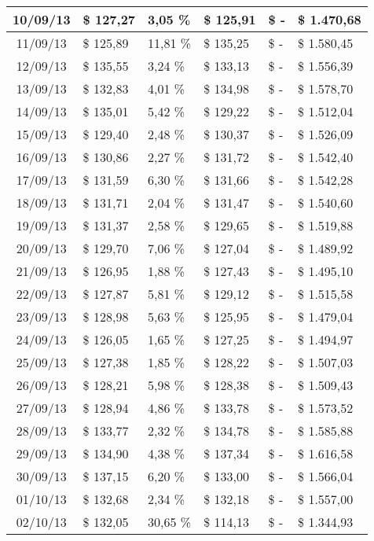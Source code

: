 \begin{small}
\begin{longtable}{|c|l|l|l|l|l|}
10/09/13 & \$ 127,27 & 3,05 \% & \$ 125,91 & \$ - & \$ 1.470,68 \\ \hline
11/09/13 & \$ 125,89 & 11,81 \% & \$ 135,25 & \$ - & \$ 1.580,45 \\ \hline
12/09/13 & \$ 135,55 & 3,24 \% & \$ 133,13 & \$ - & \$ 1.556,39 \\ \hline
13/09/13 & \$ 132,83 & 4,01 \% & \$ 134,98 & \$ - & \$ 1.578,70 \\ \hline
14/09/13 & \$ 135,01 & 5,42 \% & \$ 129,22 & \$ - & \$ 1.512,04 \\ \hline
15/09/13 & \$ 129,40 & 2,48 \% & \$ 130,37 & \$ - & \$ 1.526,09 \\ \hline
16/09/13 & \$ 130,86 & 2,27 \% & \$ 131,72 & \$ - & \$ 1.542,40 \\ \hline
17/09/13 & \$ 131,59 & 6,30 \% & \$ 131,66 & \$ - & \$ 1.542,28 \\ \hline
18/09/13 & \$ 131,71 & 2,04 \% & \$ 131,47 & \$ - & \$ 1.540,60 \\ \hline
19/09/13 & \$ 131,37 & 2,58 \% & \$ 129,65 & \$ - & \$ 1.519,88 \\ \hline
20/09/13 & \$ 129,70 & 7,06 \% & \$ 127,04 & \$ - & \$ 1.489,92 \\ \hline
21/09/13 & \$ 126,95 & 1,88 \% & \$ 127,43 & \$ - & \$ 1.495,10 \\ \hline
22/09/13 & \$ 127,87 & 5,81 \% & \$ 129,12 & \$ - & \$ 1.515,58 \\ \hline
23/09/13 & \$ 128,98 & 5,63 \% & \$ 125,95 & \$ - & \$ 1.479,04 \\ \hline
24/09/13 & \$ 126,05 & 1,65 \% & \$ 127,25 & \$ - & \$ 1.494,97 \\ \hline
25/09/13 & \$ 127,38 & 1,85 \% & \$ 128,22 & \$ - & \$ 1.507,03 \\ \hline
26/09/13 & \$ 128,21 & 5,98 \% & \$ 128,38 & \$ - & \$ 1.509,43 \\ \hline
27/09/13 & \$ 128,94 & 4,86 \% & \$ 133,78 & \$ - & \$ 1.573,52 \\ \hline
28/09/13 & \$ 133,77 & 2,32 \% & \$ 134,78 & \$ - & \$ 1.585,88 \\ \hline
29/09/13 & \$ 134,90 & 4,38 \% & \$ 137,34 & \$ - & \$ 1.616,58 \\ \hline
30/09/13 & \$ 137,15 & 6,20 \% & \$ 133,00 & \$ - & \$ 1.566,04 \\ \hline
01/10/13 & \$ 132,68 & 2,34 \% & \$ 132,18 & \$ - & \$ 1.557,00 \\ \hline
02/10/13 & \$ 132,05 & 30,65 \% & \$ 114,13 & \$ - & \$ 1.344,93 \\ \hline

\end{longtable}
\end{small}
